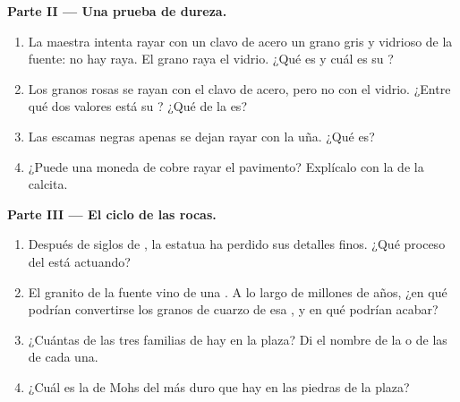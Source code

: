 \begin{problem}
\medskip
\noindent\textbf{Parte II --- Una prueba de dureza.}
\begin{enumerate}[resume]
  \item La maestra intenta rayar con un clavo de acero un grano gris y
        vidrioso de la fuente: no hay raya. El grano raya el vidrio. ¿Qué
         es y cuál es su ?
  \item Los granos rosas se rayan con el clavo de acero, pero no con el
        vidrio. ¿Entre qué dos valores está su ? ¿Qué  de la
         es?
  \item Las escamas negras apenas se dejan rayar con la uña. ¿Qué 
        es?
  \item ¿Puede una moneda de cobre rayar el pavimento? Explícalo con la
         de la calcita.
\end{enumerate}

\medskip
\noindent\textbf{Parte III --- El ciclo de las rocas.}
\begin{enumerate}[resume]
  \item Después de siglos de , la estatua ha perdido sus detalles
        finos. ¿Qué proceso del  está actuando?
  \item El granito de la fuente vino de una . A lo largo de
        millones de años, ¿en qué podrían convertirse los granos de cuarzo
        de esa , y en qué  podrían acabar?
  \item ¿Cuántas de las tres familias de  hay en la plaza? Di el
        nombre de la  o de las  de cada una.
  \item ¿Cuál es la  de Mohs del  más duro que hay en las
        piedras de la plaza?
\end{enumerate}
\end{problem}
